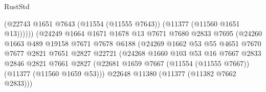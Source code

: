 \begin{lexlean}{RustStd}
\begin{coremodule}
                                            (@22743
                                              @1651
                                              @7643
                                              (@11554 (@11555 @7643))
                                              (@11377 (@11560 @1651 @13))))))
                                      (@24249
                                        @1664
                                        @1671
                                        @1678
                                        @13
                                        @7671
                                        @7680
                                        @2833
                                        @7695
                                        (@24260
                                          @1663
                                          @489
                                          @19158
                                          @7671
                                          @7678
                                          @6188
                                          (@24269
                                            @1662
                                            @53
                                            @55
                                            @4651
                                            @7670
                                            @7677
                                            @2821
                                            @7651
                                            @2827
                                            @22721
                                            (@24268
                                              @1660
                                              @103
                                              @53
                                              @16
                                              @7667
                                              @2833
                                              @2846
                                              @2821
                                              @7661
                                              @2827
                                              (@22681
                                                @1659
                                                @7667
                                                (@11554 (@11555 @7667))
                                                (@11377 (@11560 @1659 @53)))
                                              @22648
                                              @11380
                                              (@11377 (@11382 @7662 @2833)))

\end{coremodule}
\end{lexlean}

